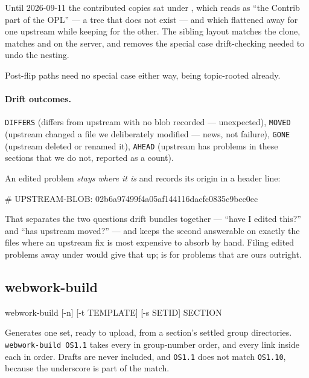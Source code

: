 Until 2026-09-11 the contributed copies sat under , which
reads as ``the Contrib part of the OPL'' --- a tree that does not exist ---
and which flattened away  for one upstream while
keeping  for the other. The sibling layout matches the clone,
matches  and  on the server,
and removes the special case drift-checking needed to undo the nesting.

Post-flip  paths need no special case either way, being
topic-rooted already.

\paragraph{Drift outcomes.}
\texttt{DIFFERS} (differs from upstream with no blob recorded --- unexpected),
\texttt{MOVED} (upstream changed a file we deliberately modified --- news, not
failure), \texttt{GONE} (upstream deleted or renamed it), \texttt{AHEAD}
(upstream has problems in these sections that we do not, reported as a count).

An edited problem \emph{stays where it is} and records its origin in a header
line:

\begin{manexsource}
# UPSTREAM-BLOB: 02b6a97499f4a05af144116dacfc0835c9bcc0ec
\end{manexsource}

That separates the two questions drift bundles together --- ``have I edited
this?'' and ``has upstream moved?'' --- and keeps the second answerable on
exactly the files where an upstream fix is most expensive to absorb by hand.
Filing edited problems away under  would give that up;
 is for problems that are ours outright.

\subsection*{webwork-build}

\begin{manexsource}
webwork-build [-n] [-t TEMPLATE] [-s SETID] SECTION
\end{manexsource}

Generates one set, ready to upload, from a section's settled group directories.
\texttt{webwork-build OS1.1} takes every  in group-number order, and every  link inside each in  order.
Drafts are never included, and \texttt{OS1.1} does not match \texttt{OS1.10}, because the underscore is part of the match.

